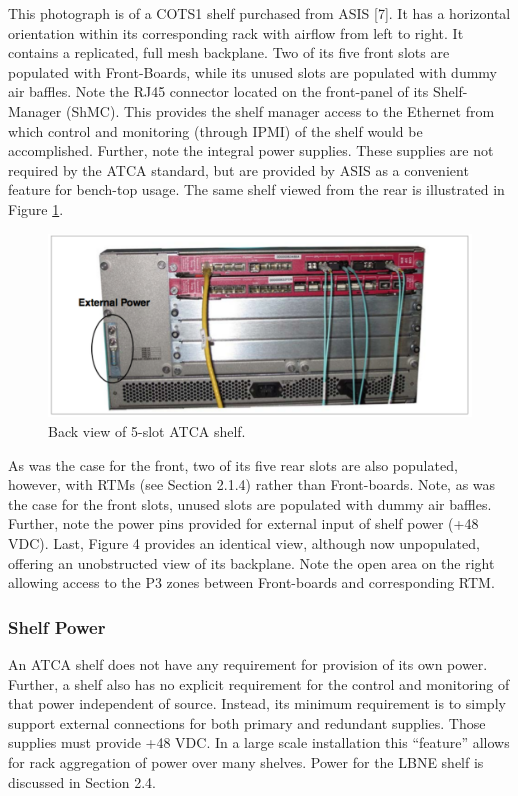 This photograph is of a COTS1 shelf purchased from ASIS [7]. It has a horizontal orientation within its corresponding rack with airflow from left to right. It contains a replicated, full mesh backplane. Two of its five front slots are populated with Front-Boards, while its unused slots are populated with dummy air baffles. Note the RJ45 connector located on the front-panel of its Shelf-Manager (ShMC). This provides the shelf manager access to the Ethernet from which control and monitoring (through IPMI) of the shelf would be accomplished. Further, note the integral power supplies. These supplies are not required by the ATCA standard, but are provided by ASIS as a convenient feature for bench-top usage. The same shelf viewed from the rear is illustrated in Figure \ref{fig:backShelf}.

\begin{figure}[tbh]
\includegraphics[scale=0.8]{shelf-back.pdf}
\caption{Back view of 5-slot ATCA shelf.}
\label{fig:backShelf}
\end{figure} 

As was the case for the front, two of its five rear slots are also populated, however, with RTMs (see Section 2.1.4) rather than Front-boards. Note, as was the case for the front slots, unused slots are populated with dummy air baffles. Further, note the power pins provided for external input of shelf power (+48 VDC). Last, Figure 4 provides an identical view, although now unpopulated, offering an unobstructed view of its backplane. Note the open area on the right allowing access to the P3 zones between Front-boards and corresponding RTM.

\subsubsection{Shelf Power}
\label{sec:shelfpower}
An ATCA shelf does not have any requirement for provision of its own power. Further, a shelf also has no explicit requirement for the control and monitoring of that power independent of source. Instead, its minimum requirement is to simply support external connections for both primary and redundant supplies. Those supplies must provide +48 VDC. In a large scale installation this “feature” allows for rack aggregation of power over many shelves.
Power for the LBNE shelf is discussed in Section 2.4.

